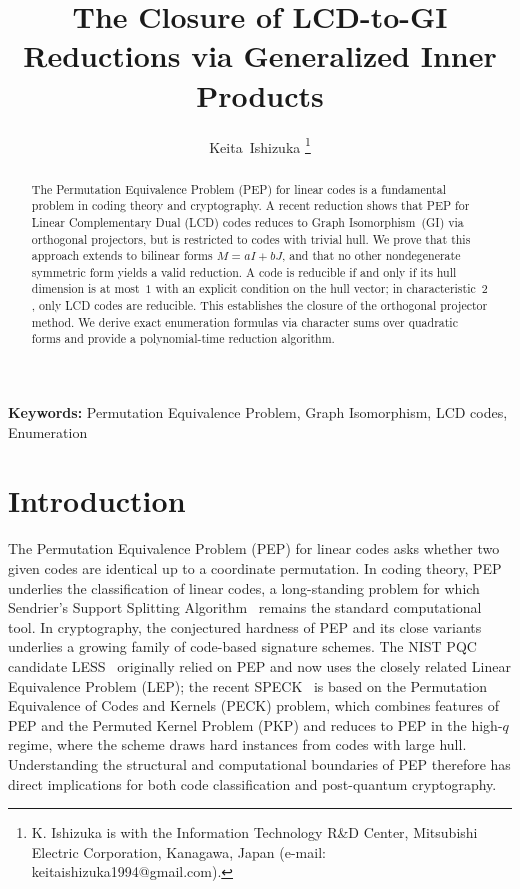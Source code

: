 \documentclass[11pt]{article}
\title{The Closure of LCD-to-GI Reductions via Generalized Inner Products}
\author{Keita~Ishizuka
\thanks{K. Ishizuka is with the Information Technology R\&D Center, Mitsubishi Electric Corporation, Kanagawa, Japan (e-mail: keitaishizuka1994@gmail.com).}}
\date{}
\newcommand{\0}{\mathbf{0}}
\newcommand{\1}{\mathbf{1}}
\theoremstyle{plain}
\theoremstyle{definition}
\theoremstyle{remark}
\begin{document}
\maketitle

\begin{abstract}
The Permutation Equivalence Problem (PEP) for linear codes is a fundamental problem in coding theory and cryptography. A recent reduction shows that PEP for Linear Complementary Dual (LCD) codes reduces to Graph Isomorphism~(GI) via orthogonal projectors, but is restricted to codes with trivial hull. We prove that this approach extends to bilinear forms $M = aI + bJ$, and that no other nondegenerate symmetric form yields a valid reduction. A code is reducible if and only if its hull dimension is at most~$1$ with an explicit condition on the hull vector; in characteristic~$2$, only LCD codes are reducible. This establishes the closure of the orthogonal projector method. We derive exact enumeration formulas via character sums over quadratic forms and provide a polynomial-time reduction algorithm.
\end{abstract}

\medskip
\noindent\textbf{Keywords:} Permutation Equivalence Problem, Graph Isomorphism, LCD codes, Enumeration

\section{Introduction}

The Permutation Equivalence Problem (PEP) for linear codes asks whether two given codes are identical up to a coordinate permutation.
In coding theory, PEP underlies the classification of linear codes, a long-standing problem for which Sendrier's Support Splitting Algorithm~\cite{sendrier2000finding} remains the standard computational tool. In cryptography, the conjectured hardness of PEP and its close variants underlies a growing family of code-based signature schemes. The NIST PQC candidate LESS~\cite{LESS} originally relied on PEP and now uses the closely related Linear Equivalence Problem (LEP); the recent SPECK~\cite{SPECK} is based on the Permutation Equivalence of Codes and Kernels (PECK) problem, which combines features of PEP and the Permuted Kernel Problem (PKP) and reduces to PEP in the high-$q$ regime, where the scheme draws hard instances from codes with large hull. Understanding the structural and computational boundaries of PEP therefore has direct implications for both code classification and post-quantum cryptography.
\end{document}
